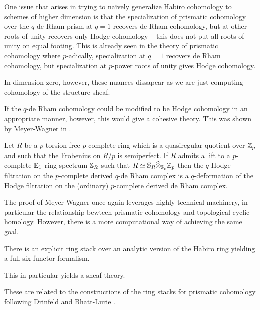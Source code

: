 One issue that arises in trying to na\"{i}vely generalize Habiro cohomology to schemes of higher dimension is that the specialization of prismatic cohomology over the $q$-de Rham prism at $q=1$ recovers de Rham cohomology, but at other roots of unity recovers only Hodge cohomology -- this does not put all roots of unity on equal footing. This is already seen in the theory of prismatic cohomology where $p$-adically, specialization at $q=1$ recovers de Rham cohomology, but specialization at $p$-power roots of unity gives Hodge cohomology. 
\begin{remark}
    In dimension zero, however, these nuances dissapear as we are just computing cohomology of the structure sheaf. 
\end{remark}

If the $q$-de Rham cohomology could be modified to be Hodge cohomology in an appropriate manner, however, this would give a cohesive theory. This was shown by Meyer-Wagner in \cite{MeyerWagner}. 
\begin{theorem}\label{thm: MeyerWagner main theorem}
    Let $R$ be a $p$-torsion free $p$-complete ring which is a quasiregular quotient over $\mathbb{Z}_{p}$ and such that the Frobenius on $R/p$ is semiperfect. If $R$ admits a lift to a $p$-complete $\mathbb{E}_{1}$ ring spectrum $\mathbb{S}_{R}$ such that $R\simeq \mathbb{S}_{R}\widehat{\otimes}_{\mathbb{S}_{p}}\mathbb{Z}_{p}$ then the $q$-Hodge filtration on the $p$-complete derived $q$-de Rham complex is a $q$-deformation of the Hodge filtration on the (ordinary) $p$-complete derived de Rham complex. 
\end{theorem} 
The proof of Meyer-Wagner once again leverages highly technical machinery, in particular the relationship bewteen prismatic cohomology and topological cyclic homology. However, there is a more computational way of achieving the same goal.
\begin{theorem}[Scholze]\label{thm: analytic Habiro cohomology}
    There is an explicit ring stack over an analytic version of the Habiro ring yielding a full six-functor formalism.
\end{theorem}
\begin{remark}\label{rmk: get a sheaf theory}
    This in particular yields a sheaf theory.
\end{remark}
These are related to the constructions of the ring stacks for prismatic cohomology following Drinfeld \cite{DrinfeldPrismatization} and Bhatt-Lurie \cite{BhattLurieAbsolute}.